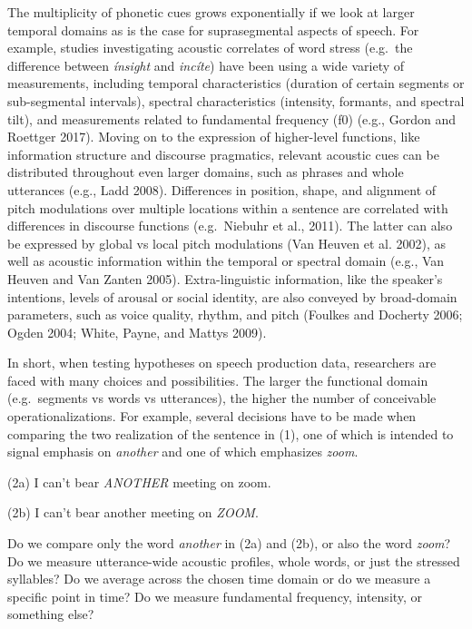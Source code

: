 \documentclass[
  12pt,
]{article}
\begin{document}
The multiplicity of phonetic cues grows exponentially if we look at larger temporal domains as is the case for suprasegmental aspects of speech.
For example, studies investigating acoustic correlates of word stress (e.g.~the difference between \emph{ínsight} and \emph{incíte}) have been using a wide variety of measurements, including temporal characteristics (duration of certain segments or sub-segmental intervals), spectral characteristics (intensity, formants, and spectral tilt), and measurements related to fundamental frequency (f0) (e.g., Gordon and Roettger 2017).
Moving on to the expression of higher-level functions, like information structure and discourse pragmatics, relevant acoustic cues can be distributed throughout even larger domains, such as phrases and whole utterances (e.g., Ladd 2008).
Differences in position, shape, and alignment of pitch modulations over multiple locations within a sentence are correlated with differences in discourse functions (e.g.~Niebuhr et al., 2011).
The latter can also be expressed by global vs local pitch modulations (Van Heuven et al. 2002), as well as acoustic information within the temporal or spectral domain (e.g., Van Heuven and Van Zanten 2005).
Extra-linguistic information, like the speaker's intentions, levels of arousal or social identity, are also conveyed by broad-domain parameters, such as voice quality, rhythm, and pitch (Foulkes and Docherty 2006; Ogden 2004; White, Payne, and Mattys 2009).

In short, when testing hypotheses on speech production data, researchers are faced with many choices and possibilities.
The larger the functional domain (e.g.~segments vs words vs utterances), the higher the number of conceivable operationalizations.
For example, several decisions have to be made when comparing the two realization of the sentence in (1), one of which is intended to signal emphasis on \emph{another} and one of which emphasizes \emph{zoom}.

\vspace{1em}

(2a) I can't bear \emph{ANOTHER} meeting on zoom.

(2b) I can't bear another meeting on \emph{ZOOM}.

\vspace{1em}

Do we compare only the word \emph{another} in (2a) and (2b), or also the word \emph{zoom}?
Do we measure utterance-wide acoustic profiles, whole words, or just the stressed syllables?
Do we average across the chosen time domain or do we measure a specific point in time?
Do we measure fundamental frequency, intensity, or something else?
\end{document}

